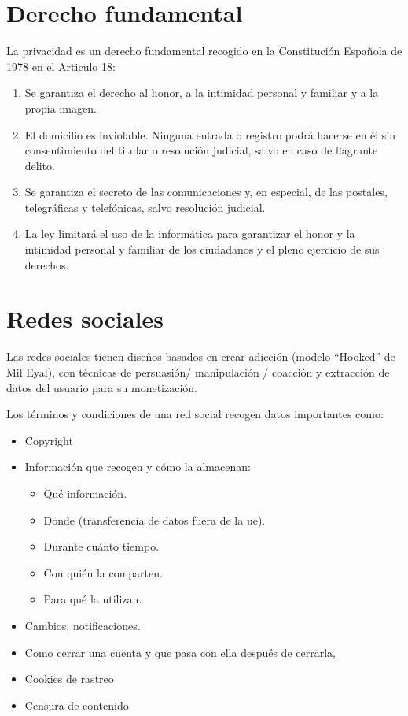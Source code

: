 
\section{Derecho fundamental}

La privacidad es un derecho fundamental recogido en la Constitución Española de 1978 en el Articulo 18:
\begin{enumerate}
    \item Se garantiza el derecho al honor, a la intimidad personal y familiar y a la propia imagen.
    \item El domicilio es inviolable. Ninguna entrada o registro podrá hacerse en él sin consentimiento del titular o resolución judicial, salvo en caso de flagrante delito.
    \item Se garantiza el secreto de las comunicaciones y, en especial, de las postales, telegráficas y telefónicas, salvo resolución judicial.
    \item La ley limitará el uso de la informática para garantizar el honor y la intimidad personal y familiar de los ciudadanos y el pleno ejercicio de sus derechos.
\end{enumerate}

\section{Redes sociales}

Las redes sociales tienen diseños basados en crear adicción (modelo ``Hooked'' de Mil Eyal), con técnicas de persuasión/ manipulación / coacción y extracción de datos del usuario para su monetización.

Los términos y condiciones de una red social recogen datos importantes como:
\begin{itemize}
    \item Copyright
    \item Información que recogen y cómo la almacenan:
          \begin{itemize}
              \item Qué información.
              \item Donde (transferencia de datos fuera de la \gls{ue}).
              \item Durante cuánto tiempo.
              \item Con quién la comparten.
              \item Para qué la utilizan.
          \end{itemize}
    \item Cambios, notificaciones.
    \item Como cerrar una cuenta y que pasa con ella después de cerrarla,
    \item Cookies de rastreo
    \item Censura de contenido
\end{itemize}

